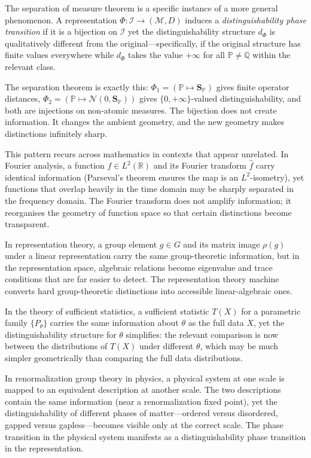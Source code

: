 \documentclass[12pt, oneside]{book}
\theoremstyle{plain}
\theoremstyle{definition}
\newcommand{\R}{\mathbb{R}}
\newcommand{\calN}{\mathcal{N}}
\newcommand{\PP}{\mathbb{P}}
\newcommand{\QQ}{\mathbb{Q}}
\newcommand{\SP}{\mathbf{S}_{\PP}}
\newcommand{\calM}{\mathcal{M}}
\newcommand{\calI}{\mathcal{I}}
\begin{document}
The separation of measure theorem is a specific instance of a more general phenomenon. A representation $\Phi: \calI \to (\calM, D)$ induces a \emph{distinguishability phase transition} if it is a bijection on $\calI$ yet the distinguishability structure $d_\Phi$ is qualitatively different from the original---specifically, if the original structure has finite values everywhere while $d_\Phi$ takes the value $+\infty$ for all $\PP \neq \QQ$ within the relevant class.

The separation theorem is exactly this: $\Phi_1 = (\PP \mapsto \SP)$ gives finite operator distances, $\Phi_2 = (\PP \mapsto \calN(0, \SP))$ gives $\{0, +\infty\}$-valued distinguishability, and both are injections on non-atomic measures. The bijection does not create information. It changes the ambient geometry, and the new geometry makes distinctions infinitely sharp.

This pattern recurs across mathematics in contexts that appear unrelated. In Fourier analysis, a function $f \in L^2(\R)$ and its Fourier transform $\hat f$ carry identical information (Parseval's theorem ensures the map is an $L^2$-isometry), yet functions that overlap heavily in the time domain may be sharply separated in the frequency domain. The Fourier transform does not amplify information; it reorganises the geometry of function space so that certain distinctions become transparent.

In representation theory, a group element $g \in G$ and its matrix image $\rho(g)$ under a linear representation carry the same group-theoretic information, but in the representation space, algebraic relations become eigenvalue and trace conditions that are far easier to detect. The representation theory machine converts hard group-theoretic distinctions into accessible linear-algebraic ones.

In the theory of sufficient statistics, a sufficient statistic $T(X)$ for a parametric family $\{P_\theta\}$ carries the same information about $\theta$ as the full data $X$, yet the distinguishability structure for $\theta$ simplifies: the relevant comparison is now between the distributions of $T(X)$ under different $\theta$, which may be much simpler geometrically than comparing the full data distributions.

In renormalization group theory in physics, a physical system at one scale is mapped to an equivalent description at another scale. The two descriptions contain the same information (near a renormalization fixed point), yet the distinguishability of different phases of matter---ordered versus disordered, gapped versus gapless---becomes visible only at the correct scale. The phase transition in the physical system manifests as a distinguishability phase transition in the representation.
\end{document}
